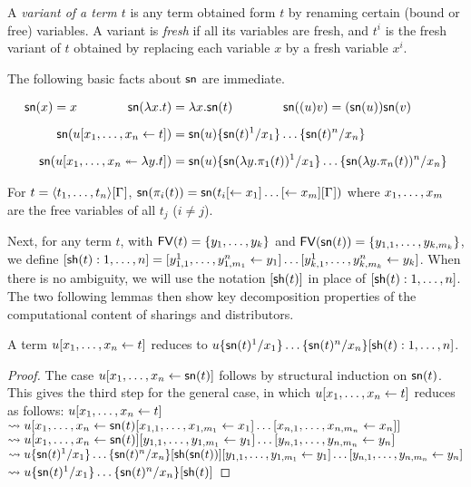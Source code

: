 \documentclass{llncs} %
\begin{document}
A \emph{variant of a term $t$} is any term obtained form $t$ by
renaming certain (bound or free) variables.
%
A variant is \emph{fresh} if all its variables are fresh, and $t^i$ is the fresh variant of $t$ obtained by replacing each
variable $x$ by a fresh variable $x^i$.


The following basic facts about $\sn$ are immediate.

\begin{proposition}
\[
\begin{aligned}
	\sn(x) = x \quads4
	\sn(\lambda x.t) & =\lambda x.\sn(t) \quads4
	\sn((u)v) = (\sn(u))\sn(v)
\\[5pt]
   \sn(u\share xt) & =\sn(u)\sub{x_1}{\sn(t)^1}\dots\sub{x_n}{\sn(t)^n}
\\[5pt]
	\sn(u\distr xyt) &=\sn(u)\sub{x_1}{\sn(\lambda y.\pi_1(t))^1}\dots\sub{x_n}{\sn(\lambda y.\pi_n(t))^n} 
\end{aligned}
\]
\end{proposition}

\begin{proposition}\label{prop:sn_pi}
For $t=\tup t\G$, $\sn(\pi_i(t))=\sn(t_i\share*{}{x_1}\dots\share*{}{x_m}\G)$ where
$\vv[m]x$ are the free variables of all $t_j$ ($i\neq j$). 
\end{proposition}


Next, for any term $t$, with $\FV(t)=\{y_1,\dots,y_k\}$ and $\FV(\sn(t))=\{y_{1,1},\dots,y_{k,m_k}\}$, we define
$[\sh (t):1,\dots,n] =
\share*{y_{1,1}^1,\dots,y_{1,m_1}^n}{y_1}\dots
\share*{y_{k,1}^1,\dots,y_{k,m_k}^n}{y_k}$.
%
When there is no ambiguity, we will use the notation $[\sh (t)]$ in place of $[\sh (t):1,\dots,n]$.
%
The two following lemmas then show key decomposition properties of the computational content of sharings and distributors.

 
\begin{lemma}
\label{lem:unsharing}
A term $u\share xt$ reduces to $u\sub{x_1}{\sn(t)^1}\dots\sub{x_n}{\sn(t)^n}[\sh (t):1,\dots,n]$.
\end{lemma}

\begin{proof}
The case $u\share x{\sn(t)}$ follows by structural induction on $\sn(t)$. 
%
This gives the third step for the general case, in which
$u\share xt$ reduces as follows: $u\share xt$
\\ $ \rewrite u\share x{\sn(t)\share*{x_{1,1},\dots,x_{1,m_1}}{x_1}\dots\share*{x_{n,1},\dots,x_{n,m_n}}{x_n}}$
\\ $ \rewrite u\share x{\sn(t)}\share*{y_{1,1},\dots,y_{1,m_1}}{y_1}\dots\share*{y_{n,1},\dots,y_{n,m_n}}{y_n}$
\\ $ \rewrite u\sub{x_1}{\sn(t)^1}\dots\sub{x_n}{\sn(t)^n}[\sh(\sn(t))]\share*{y_{1,1},\dots,y_{1,m_1}}{y_1}\dots\share*{y_{n,1},\dots,y_{n,m_n}}{y_n}$
\\ $\rewrite u\sub{x_1}{\sn(t)^1}\dots\sub{x_n}{\sn(t)^n}[\sh(t)]$
\end{proof}
\end{document}
